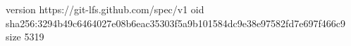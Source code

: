 version https://git-lfs.github.com/spec/v1
oid sha256:3294b49c6464027e08b6eac35303f5a9b101584dc9e38e97582fd7e697f466c9
size 5319
